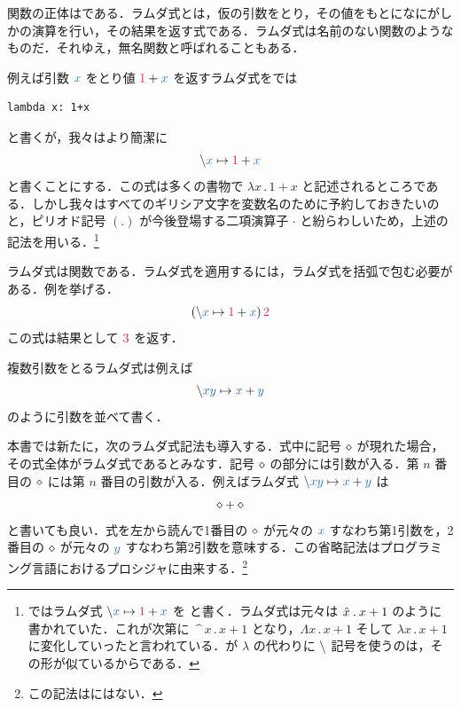 \documentclass[a5paper,twoside,fleqn,draft]{jsbook}
\begin{document}
関数の正体はである．ラムダ式とは，仮の引数をとり，その値をもとになにがしかの演算を行い，その結果を返す式である．ラムダ式は名前のない関数のようなものだ．それゆえ，無名関数と呼ばれることもある．

例えば引数 $\hVar{x}$ をとり値 $\hConstant{1}+\hVar{x}$ を返すラムダ式を\python では
\begin{pythoncode}
\begin{verbatim}
lambda x: 1+x
\end{verbatim}
\end{pythoncode}
と書くが，我々はより簡潔に
\begin{equation}
  \hLambdaSyntax{\hVar{x}}{\hConstant{1}+\hVar{x}}
\end{equation}
と書くことにする．この式は多くの書物で $\lambda x\mathbin{.}1+x$ と記述されるところである．しかし我々はすべてのギリシア文字を変数名のために予約しておきたいのと，ピリオド記号 $(.)$ が今後登場する二項演算子 $\cdot$ と紛らわしいため，上述の記法を用いる．\footnote{\haskell ではラムダ式 $\hLambdaSyntax{\hVar{x}}{\hConstant{1}+\hVar{x}}$ を  と書く．ラムダ式は元々は $\Hat{x}\mathbin{.}x+1$ のように書かれていた．これが次第に $\mathop{\texttt{\textasciicircum}}x\mathbin{.}x+1$ となり，$\Lambda x\mathbin{.}x+1$ そして $\lambda x\mathbin{.}x+1$ に変化していったと言われている．\haskell が $\lambda$ の代わりに $\backslash$ 記号を使うのは，その形が似ているからである．}

ラムダ式は関数である．ラムダ式を適用するには，ラムダ式を括弧で包む必要がある．例を挙げる．
\begin{equation}
  (\hLambdaSyntax{\hVar{x}}{\hConstant{1}+\hVar{x}})\,\hConstant{2}
\end{equation}
この式は結果として $\hConstant{3}$ を返す．

複数引数をとるラムダ式は例えば
\begin{equation}
  \hLambdaSyntax{\hVar{x}\hVar{y}}{\hVar{x}+\hVar{y}}
\end{equation}
のように引数を並べて書く．

本書では新たに，次のラムダ式記法も導入する．式中に記号 $\diamond$ が現れた場合，その式全体がラムダ式であるとみなす．記号 $\diamond$ の部分には引数が入る．第 $n$ 番目の $\diamond$ には第 $n$ 番目の引数が入る．例えばラムダ式 $\hLambdaSyntax{\hVar{x}\hVar{y}}{\hVar{x}+\hVar{y}}$ は
\begin{equation}
  \diamond+\diamond
\end{equation}
と書いても良い．式を左から読んで1番目の $\diamond$ が元々の $\hVar{x}$ すなわち第1引数を，2番目の $\diamond$ が元々の $\hVar{y}$ すなわち第2引数を意味する．この省略記法はプログラミング言語\scheme におけるプロシジャに由来する．\footnote{この記法は\haskell にはない．}
\end{document}
